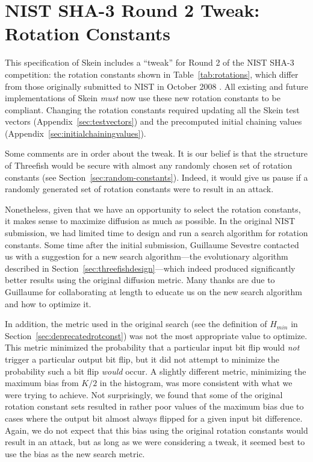 \documentclass[11pt,twoside]{article}
\begin{document}
\section{NIST SHA-3 Round 2 Tweak: Rotation Constants}\label{sec:tweakrotconst}

This specification of Skein includes a ``tweak'' for Round 2 of the NIST SHA-3 competition: the rotation constants shown in Table~\ref{tab:rotations}, which differ from those originally submitted to NIST in October 2008 \cite{Skein1}. All existing and future implementations of Skein \emph{must} now use these new rotation constants to be compliant. Changing the rotation constants required updating all the Skein test vectors
(Appendix~\ref{sec:testvectors}) and the precomputed initial chaining values
(Appendix~\ref{sec:initialchainingvalues}).

Some comments are in order about the tweak. It is our belief is that the structure of Threefish would be secure with almost any randomly chosen set of rotation constants (see Section~\ref{sec:random-constants}). Indeed, it would give us pause if a randomly generated set of rotation constants were to result in an attack.

Nonetheless, given that we have an opportunity to select the rotation constants, it makes sense to maximize diffusion as much as possible. In the original NIST submission, we had limited time to design and run a search algorithm for rotation constants. Some time after the initial submission, Guillaume Sevestre contacted us \cite{Sev09} with a suggestion for a new search algorithm---the evolutionary algorithm described in Section~\ref{sec:threefishdesign}---which indeed produced significantly better results using the original diffusion metric. Many thanks are due to Guillaume for collaborating at length to educate us on the new search algorithm and how to optimize it.

In addition, the metric used in the original search (see the definition of $H_{min}$ in Section~\ref{sec:deprecatedrotconst}) was not the most appropriate value to optimize.  This metric minimized the probability that a particular input bit flip would \emph{not} trigger a particular output bit flip, but it did not attempt to minimize the probability such a bit flip \emph{would} occur. A slightly different metric, minimizing the maximum bias from $K/2$ in the histogram, was more consistent with what we were trying to achieve. Not surprisingly, we found that some of the original rotation constant sets resulted in rather poor values of the maximum bias due to cases where the output bit almost always flipped for a given input bit difference.  Again, we do not expect that this bias using the original rotation constants would result in an attack, but as long as we were considering a tweak, it seemed best to use the bias as the new search metric. 
\end{document}
